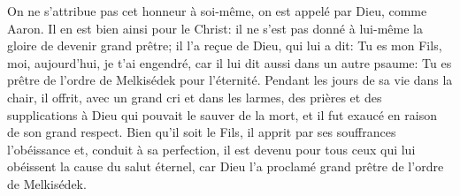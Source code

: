 On ne s’attribue pas cet honneur à soi-même,
	on est appelé par Dieu, comme Aaron.
Il en est bien ainsi pour le Christ:
	il ne s’est pas donné à lui-même la gloire de devenir grand prêtre;
	il l’a reçue de Dieu, qui lui a dit:
	Tu es mon Fils, moi, aujourd’hui, je t’ai engendré,
	car il lui dit aussi dans un autre psaume:
	Tu es prêtre de l’ordre de Melkisédek pour l’éternité.
Pendant les jours de sa vie dans la chair,
	il offrit, avec un grand cri et dans les larmes,
	des prières et des supplications à Dieu qui pouvait le sauver de la mort,
	et il fut exaucé en raison de son grand respect.
Bien qu’il soit le Fils, il apprit par ses souffrances l’obéissance
	et, conduit à sa perfection,
	il est devenu pour tous ceux qui lui obéissent la cause du salut éternel,
	car Dieu l’a proclamé grand prêtre de l’ordre de Melkisédek.
